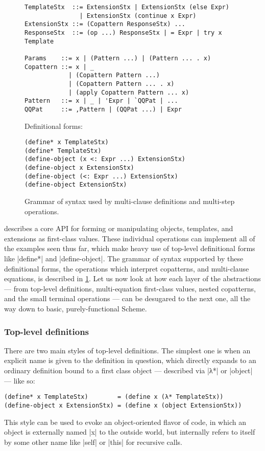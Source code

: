 \begin{figure}[t]
\centering

\begin{verbatim}
TemplateStx  ::= ExtensionStx | ExtensionStx (else Expr)
               | ExtensionStx (continue x Expr)
ExtensionStx ::= (Copattern ResponseStx) ...
ResponseStx  ::= (op ...) ResponseStx | = Expr | try x Template

Params    ::= x | (Pattern ...) | (Pattern ... . x)
Copattern ::= x | _
            | (Copattern Pattern ...)
            | (Copattern Pattern ... . x)
            | (apply Copattern Pattern ... x)
Pattern   ::= x | _ | 'Expr | `QQPat | ...
QQPat     ::= ,Pattern | (QQPat ...) | Expr
\end{verbatim}

Definitional forms:
\begin{verbatim}
(define* x TemplateStx)
(define* TemplateStx)
(define-object (x <: Expr ...) ExtensionStx)
(define-object x ExtensionStx)
(define-object (<: Expr ...) ExtensionStx)
(define-object ExtensionStx)
\end{verbatim}

\caption{Grammar of syntax used by multi-clause definitions and multi-step operations.}
\label{fig:macro-syntax}
\end{figure}

 describes a core API for forming or manipulating objects, templates, and extensions as first-class values.  These individual operations can implement all of the examples seen thus far, which make heavy use of top-level definitional forms like \scm|define*| and \scm|define-object|.  The grammar of syntax supported by these definitional forms, the operations which interpret copatterns, and multi-clause equations, is described in \cref{fig:macro-syntax}.  Let us now look at how each layer of the abstractions --- from top-level definitions, multi-equation first-class values, nested copatterns, and the small terminal operations --- can be desugared to the next one, all the way down to basic, purely-functional Scheme.

\subsubsection{Top-level definitions}

There are two main styles of top-level definitions.  The simplest one is when an explicit name is given to the definition in question, which directly expands to an ordinary definition bound to a first class object --- described via \scm|λ*| or \scm|object| --- like so:
\begin{verbatim}
(define* x TemplateStx)        = (define x (λ* TemplateStx))
(define-object x ExtensionStx) = (define x (object ExtensionStx))
\end{verbatim}
This style can be used to evoke an object-oriented flavor of code, in which an object is externally named \scm|x| to the outside world, but internally refers to itself by some other name like \scm|self| or \scm|this| for recursive calls.

